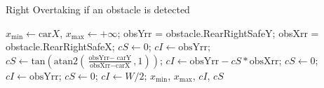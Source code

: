 \documentclass[conference,11pt]{IEEEtran}
\begin{document}
\begin{algorithm}%
\caption{Right Overtaking if an obstacle is detected}
\small
\begin{algorithmic}[1]
  \State $x_\text{min} \gets \text{car}X $,  $x_\text{max} \gets +\infty$;
  \State obsYrr = obstacle.RearRightSafeY;
  \State obsXrr = obstacle.RearRightSafeX;
        \State $cS \gets 0$; $cI \gets \text{obsYrr}$;
        \Else
        \State $cS \gets \text{tan}(\text{atan2}(\frac{\text{obsYrr}-\text{ carY}}{\text{obsXrr}-\text{carX}},1))$;
        \State $cI \gets \text{obsYrr}-cS*\text{obsXrr}$;
        \EndIf
    \Else
    \State $cS \gets 0$; $cI \gets \text{obsYrr}$;
    \Else
        \State $cS \gets 0$; $cI \gets W/2$;
    \EndIf
    \EndIf
  \State \Return $x_\text{min}$, $x_\text{max}$, $cI$, $cS$
\EndFunction
\end{algorithmic}
\label{alg:rightOvertaking}
\end{algorithm}
%
%
\end{document}
